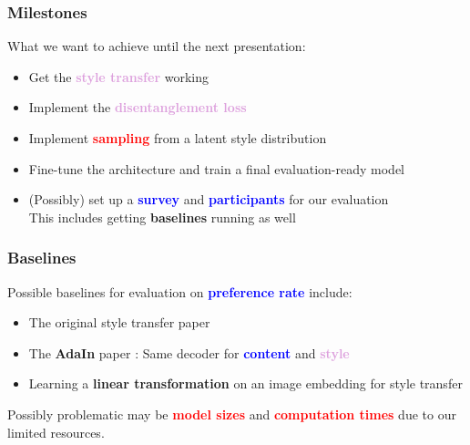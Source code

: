 \documentclass[11pt,xcolor=dvipsnames]{beamer}
\begin{document}
\begin{frame}
\frametitle{Milestones}

What we want to achieve until the next presentation:
	\vspace{10pt}
\begin{itemize}
	\item Get the \textcolor{Plum}{\textbf{style transfer}} working
	\vspace{10pt}
	\item Implement the \textcolor{Plum}{\textbf{disentanglement loss}}
	\vspace{10pt}
	\item Implement \textcolor{red}{\textbf{sampling}} from a latent style distribution
	\vspace{10pt}
	\item Fine-tune the architecture and train a final evaluation-ready model
	\vspace{10pt}
	\item (Possibly) set up a \textcolor{blue}{\textbf{survey}} and \textcolor{blue}{\textbf{participants}} for our evaluation
	\\
	This includes getting \textbf{baselines} running as well
\end{itemize}
\end{frame}

\begin{frame}
\frametitle{Baselines}

Possible baselines for evaluation on \textcolor{blue}{\textbf{preference rate}} include:
	\vspace{10pt}

\begin{itemize}
\item The original style transfer paper \cite{gatys}
	\vspace{10pt}
	\item The \textbf{AdaIn} paper \cite{adain}: Same decoder for \textbf{\textcolor{blue}{content}} and \textcolor{Plum}{\textbf{style}}
	\vspace{10pt} 
	\item Learning a \textbf{linear transformation} on an image embedding for style transfer \cite{linear}
	\vspace{10pt} 
	
\end{itemize}

Possibly problematic may be \textcolor{red}{\textbf{model sizes}} and \textcolor{red}{\textbf{computation times}} due to our limited resources.


\end{frame}
\end{document}

